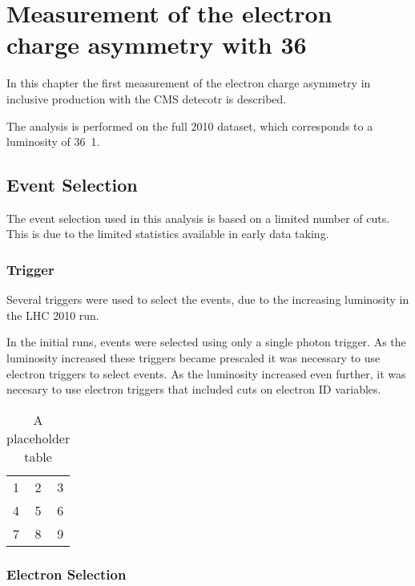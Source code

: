 \chapter{ 
Measurement of the electron charge asymmetry with \unit{36}{\invpb} }


In this chapter the first measurement of the electron charge asymmetry in
inclusive \inclusiveWe production with the CMS detecotr is described.

The analysis is performed on the full 2010 dataset, which corresponds to a
luminosity of \unit{36.1}{\invpb}.


\section{Event Selection}

The event selection used in this analysis is based on a limited number of cuts.
This is due to the limited statistics available in early data taking.

\subsection{Trigger}

Several triggers were used to select the events, due to the increasing
luminosity in the LHC 2010 run.

In the initial runs, events were selected using only a single photon trigger. 
As the luminosity increased these triggers became prescaled it was
necessary to use electron triggers to select events. 
As the luminosity increased even further, it was necesary to use electron
triggers that included cuts on electron ID variables.

\begin{table}[htb]
  \centering
  \begin{tabular}{| l c r |}
    \hline
    1 & 2 & 3 \\
    4 & 5 & 6 \\
    7 & 8 & 9 \\
  \hline
  \end{tabular}
  \caption{A placeholder table}
  \label{asym36:triggers}
\end{table}

\subsection{Electron Selection}

